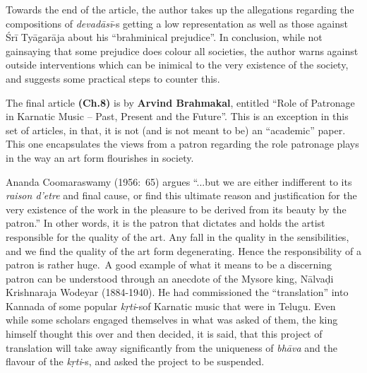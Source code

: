 \vspace{-.1cm}

Towards the end of the article, the author takes up the allegations regarding the compositions of \textit{devadāsī}-s getting a low representation as well as those against Śrī Tyāgarāja about his “brahminical prejudice”. In conclusion, while not gainsaying that some prejudice does colour all societies, the author warns against outside interventions which can be inimical to the very existence of the society, and suggests some practical steps to counter this.

\vspace{-.1cm}

The final article \textbf{(Ch.8)} is by \textbf{Arvind Brahmakal}, entitled “Role of Patronage in Karnatic Music – Past, Present and the Future”. This is an exception in this set of articles, in that, it is not (and is not meant to be) an “academic” paper. This one encapsulates the views from a patron regarding the role patronage plays in the way an art form flourishes in society.

Ananda Coomaraswamy (1956:~65) argues “...but we are either indifferent to its \textit{raison d'etre} and final cause, or find this ultimate reason and justification for the very existence of the work in the pleasure to be derived from its beauty by the patron.” In other words, it is the patron that dictates and holds the artist responsible for the quality of the art. Any fall in the quality in the sensibilities, and we find the quality of the art form degenerating. Hence the responsibility of a patron is rather huge.~A good example of what it means to be a discerning patron can be understood through an anecdote of the Mysore king, Nālvaḍi Krishnaraja Wodeyar (1884-1940). He had commissioned the “translation” into Kannada of some popular \textit{kṛti}-s\break of Karnatic music that were in Telugu. Even while some scholars engaged themselves in what was asked of them, the king himself thought this over and then decided, it is said, that this project of translation will take away significantly from the uniqueness of \textit{bhāva} and the flavour of the \textit{kṛti}-s, and asked the project to be suspended.

